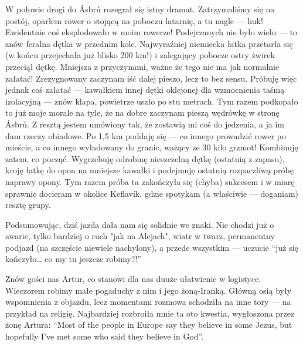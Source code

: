 W połowie drogi do Ásbrú rozegrał się istny dramat. Zatrzymaliśmy się na postój, oparłem rower o stojącą na poboczu latarnię, a tu nagle --- huk! Ewidentnie coś eksplodowało w moim rowerze! Podejrzanych nie było wielu --- to znów feralna dętka w przednim kole. Najwyraźniej niemiecka łatka przetarła się (w końcu przejechała już blisko 200 km!) i zalegający pobocze ostry żwirek przeciął dętkę. Mniejsza z przyczynami, ważne że tego nie ma jak normalnie załatać! Zrezygnowany zaczynam iść dalej pieszo, lecz to bez sensu. Próbuję więc jednak coś załatać --- kawałkiem innej dętki oklejonej dla wzmocnienia taśmą izolacyjną --- znów klapa, powietrze uszło po stu metrach. Tym razem podkopało to już moje morale na tyle, że na dobre zaczynam pieszą wędrówkę w stronę Ásbrú. Z resztą jestem umówiony tak, że zostawią mi coś do jedzenia, a ja im dam rzeczy obiadowe. Po 1,5 km poddaję się --- co innego prowadzić rower po mieście, a co innego wyładowany do granic, ważący ze 30 kilo grzmot! Kombinuję zatem, co począć. Wygrzebuję odrobinę nieszczelną dętkę (ostatnią z zapasu), kroję łatkę do opon na mniejsze kawałki i podejmuję ostatnią rozpaczliwą próbę naprawy opony. Tym razem próba ta zakończyła się (chyba) sukcesem i w miarę sprawnie docieram w okolice Keflavík, gdzie spotykam (a właściwie --- doganiam) resztę grupy.

Podsumowując, dziś jazda dała nam się solidnie we znaki. Nie chodzi już o awarie, tylko bardziej o ruch "jak na Alejach", wiatr w twarz, permanentny podjazd (na szczęście niewiele nachylony), a przede wszystkim --- uczucie “już się kończyło… co my tu jeszcze robimy?!”

Znów gości nas Artur, co stanowi dla nas duuże ułatwienie w logistyce. Wieczorem robimy małe pogaduchy z nim i jego żoną-Iranką. Główną osią były wspomnienia z objazdu, lecz momentami rozmowa schodziła na inne tory --- na przykład na religię. Najbardziej rozbroiła mnie ta oto kwestia, wygłoszona przez żonę Artura: “Most of the people in Europe say they believe in some Jezus, but hopefully I’ve met some who said they believe in God”.

